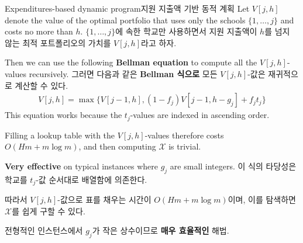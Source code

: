 \documentclass[11pt,mathserif,notheorems]{beamer}
\theoremstyle{definition}
\theoremstyle{definition}
\begin{document}
\begin{frame}{\ifen Expenditures-based dynamic program\else 지원 지출액 기반 동적 계획\fi}
\ifen Let $V[j,h] $ denote the value of the optimal portfolio that uses only the schools $\{ 1, \dots, j\}$ and costs no more than $h$.
\else $\{ 1, \dots, j\}$에 속한 학교만 사용하면서 지원 지출액이 $h$를 넘지 않는 최적 포트폴리오의 가치를 $V[j, h]$라고 하자.\fi

\ifen Then we can use the following \textbf{Bellman equation} to compute all the $V[j, h]$-values recursively.
\else 그러면 다음과 같은 \textbf{Bellman 식으로} 모든 $V[j, h]$-값은 재귀적으로 계산할 수 있다. \fi
\begin{align*}
V[j, h] = \max\bigl\{ V[j-1, h], (1 - f_j) V[j-1, h-g_j] + f_j t_j \bigr\}
\end{align*}
\ifen
This equation works because the $t_j$-values are indexed in ascending order.

Filling a lookup table with the $V[j, h]$-values therefore costs $O(Hm + m\log m)$, and then computing $\mathcal{X}$ is trivial.

\textbf{Very effective} on typical instances where $g_j$ are small integers.
\else
이 식의 타당성은 학교를 $t_j$-값 순서대로 배열함에 의존한다.

따라서 $V[j, h]$-값으로 표를 채우는 시간이 $O(Hm + m\log m)$이며, 이를 탐색하면 $\mathcal{X}$를 쉽게 구할 수 있다.

전형적인 인스턴스에서 $g_j$가 작은 상수이므로 \textbf{매우 효율적인} 해법.
\fi
\end{frame}
\end{document}
